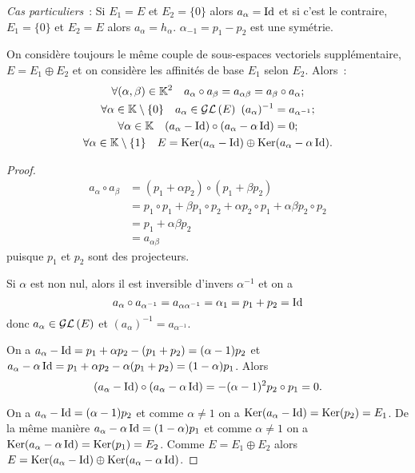\emph{Cas particuliers}~: Si \(E_1=E\) et \(E_2=\{0\}\) alors \(a_\alpha=\operatorname{Id}\) et si c'est le contraire, \(E_1=\{0\}\) et \(E_2=E\) alors \(a_\alpha=h_\alpha\). \(\alpha_{-1}=p_1-p_2\) est une symétrie.

\begin{prop}
  On considère toujours le même couple de sous-espaces vectoriels supplémentaire, \(E=E_1 \oplus E_2\) et on considère les affinités de base \(E_1\) selon \(E_2\). Alors~:
  \begin{gather}
    \forall (\alpha,\beta) \in \K^2 \quad a_{\alpha} \circ a_{\beta} = a_{\alpha \beta} = a_{\beta} \circ a_{\alpha} ;\\
    \forall \alpha \in \K\setminus\{0\} \quad a_\alpha \in \GL{E} \ (a_\alpha)^{-1}=a_{\alpha^{-1}} ; \\
    \forall \alpha \in \K \quad (a_\alpha-\Id) \circ (a_\alpha -\alpha \Id)=0 ; \\
    \forall \alpha \in \K\setminus\{1\} \quad E=\Ker(a_\alpha - \Id) \oplus \Ker(a_\alpha - \alpha \Id).
  \end{gather}
\end{prop}
\begin{proof}
    \begin{align}
      a_{\alpha} \circ a_{\beta} &= (p_1+\alpha p_2) \circ (p_1+\beta p_2) \\
      &= p_1 \circ p_1 + \beta p_1 \circ p_2 + \alpha p_2 \circ p_1 +\alpha \beta p_2 \circ p_2 \\
      &=p_1+ \alpha\beta p_2\\
      &=a_{\alpha\beta}
    \end{align}
    puisque \(p_1\) et \(p_2\) sont des projecteurs.

    Si \(\alpha\) est non nul, alors il est inversible d'invers \(\alpha^{-1}\) et on a
    \begin{equation}
      a_\alpha \circ a_{\alpha^{-1}} = a_{\alpha \alpha^{-1}} = \alpha_1 = p_1+p_2=\operatorname{Id}
    \end{equation}
    donc \(a_\alpha \in \mathcal{GL}\left(E\right)\) et \((a_\alpha)^{-1}=a_{\alpha^{-1}}\).

    On a \(a_\alpha - \operatorname{Id}=p_1+\alpha p_2 -(p_1+p_2) = (\alpha-1)p_2\) et \(a_\alpha -\alpha \operatorname{Id} = p_1+\alpha p_2 -\alpha(p_1+p_2) = (1-\alpha)p_1\). Alors
    \begin{equation}
      (a_\alpha-\operatorname{Id}) \circ (a_\alpha -\alpha \operatorname{Id}) = -(\alpha-1)^2 p_2 \circ p_1=0.
    \end{equation}

    On a \(a_\alpha-\operatorname{Id} = (\alpha-1)p_2\) et comme \(\alpha \neq 1\) on a \(\operatorname{Ker}(a_\alpha-\operatorname{Id})=\operatorname{Ker}(p_2)=E_1\). De la même manière \(a_{\alpha}-\alpha \operatorname{Id} = (1-\alpha)p_1\) et comme \(\alpha \neq 1\) on a \(\operatorname{Ker}(a_\alpha-\alpha\operatorname{Id})=\operatorname{Ker}(p_1)=E_2\). Comme \(E=E_1 \oplus E_2\) alors \(E=\operatorname{Ker}(a_\alpha - \operatorname{Id}) \oplus \operatorname{Ker}(a_\alpha - \alpha \operatorname{Id})\).
\end{proof}


